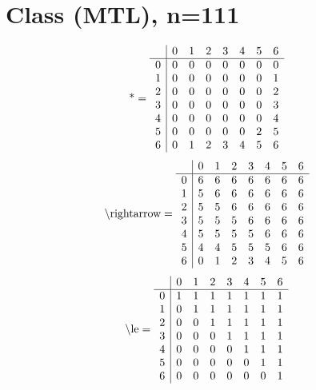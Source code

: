 \documentclass[11pt]{article}
\begin{document}
\section{Class (MTL), n=111}
\[\text{*} = 
\begin{array}{r | r r r r r r r}
 & 0 & 1 & 2 & 3 & 4 & 5 & 6 \\ \hline
0 & 0 & 0 & 0 & 0 & 0 & 0 & 0 \\
1 & 0 & 0 & 0 & 0 & 0 & 0 & 1 \\
2 & 0 & 0 & 0 & 0 & 0 & 0 & 2 \\
3 & 0 & 0 & 0 & 0 & 0 & 0 & 3 \\
4 & 0 & 0 & 0 & 0 & 0 & 0 & 4 \\
5 & 0 & 0 & 0 & 0 & 0 & 2 & 5 \\
6 & 0 & 1 & 2 & 3 & 4 & 5 & 6 \\
\end{array}
\]
\[\text{\textbackslash rightarrow} = 
\begin{array}{r | r r r r r r r}
 & 0 & 1 & 2 & 3 & 4 & 5 & 6 \\ \hline
0 & 6 & 6 & 6 & 6 & 6 & 6 & 6 \\
1 & 5 & 6 & 6 & 6 & 6 & 6 & 6 \\
2 & 5 & 5 & 6 & 6 & 6 & 6 & 6 \\
3 & 5 & 5 & 5 & 6 & 6 & 6 & 6 \\
4 & 5 & 5 & 5 & 5 & 6 & 6 & 6 \\
5 & 4 & 4 & 5 & 5 & 5 & 6 & 6 \\
6 & 0 & 1 & 2 & 3 & 4 & 5 & 6 \\
\end{array}
\]
\[\text{\textbackslash le} = 
\begin{array}{r | r r r r r r r}
 & 0 & 1 & 2 & 3 & 4 & 5 & 6 \\ \hline
0 & 1 & 1 & 1 & 1 & 1 & 1 & 1 \\
1 & 0 & 1 & 1 & 1 & 1 & 1 & 1 \\
2 & 0 & 0 & 1 & 1 & 1 & 1 & 1 \\
3 & 0 & 0 & 0 & 1 & 1 & 1 & 1 \\
4 & 0 & 0 & 0 & 0 & 1 & 1 & 1 \\
5 & 0 & 0 & 0 & 0 & 0 & 1 & 1 \\
6 & 0 & 0 & 0 & 0 & 0 & 0 & 1 \\
\end{array}
\]
\end{document}
